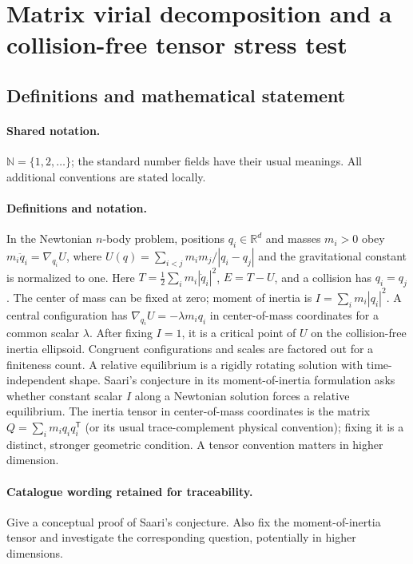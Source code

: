 \documentclass[11pt]{article}
\begin{document}
\section{Matrix virial decomposition and a collision-free tensor stress test}\label{statement}

\subsection{Definitions and mathematical statement}

\paragraph{Shared notation.}$\mathbb N=\{1,2,\ldots\}$; the standard number fields have their usual meanings. All additional conventions are stated locally.


\paragraph{Definitions and notation.}In the Newtonian $n$-body problem, positions $q_i\in\mathbb R^d$ and masses $m_i>0$ obey $m_i\ddot q_i=\nabla_{q_i}U$, where $U(q)=\sum_{i<j}m_im_j/|q_i-q_j|$ and the gravitational constant is normalized to one. Here $T=\tfrac12\sum_i m_i|\dot q_i|^2$, $E=T-U$, and a collision has $q_i=q_j$. The center of mass can be fixed at zero; moment of inertia is $I=\sum_i m_i|q_i|^2$. A central configuration has $\nabla_{q_i}U=-\lambda m_iq_i$ in center-of-mass coordinates for a common scalar $\lambda$. After fixing $I=1$, it is a critical point of $U$ on the collision-free inertia ellipsoid. Congruent configurations and scales are factored out for a finiteness count. A relative equilibrium is a rigidly rotating solution with time-independent shape. Saari’s conjecture in its moment-of-inertia formulation asks whether constant scalar $I$ along a Newtonian solution forces a relative equilibrium. The inertia tensor in center-of-mass coordinates is the matrix $Q=\sum_i m_iq_iq_i^{\mathsf T}$ (or its usual trace-complement physical convention); fixing it is a distinct, stronger geometric condition. A tensor convention matters in higher dimension.

\paragraph{Catalogue wording retained for traceability.}
Give a conceptual proof of Saari’s conjecture. Also fix the moment-of-inertia tensor and investigate the corresponding question, potentially in higher dimensions.
\end{document}

